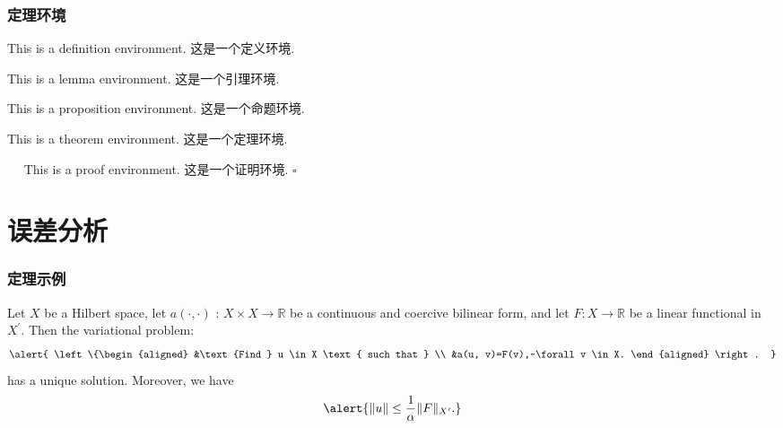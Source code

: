 \documentclass[noamsthm,notheorems,11pt,compress]{beamer}
\numberwithin{figure}{section}
\numberwithin{table}{section}
\numberwithin{equation}{section}
\theoremstyle{plain} %
\newenvironment{proof}[1][证明]{{\color{structure.fg}\textbf{#1}:}~~}{\hfill\ensuremath{\square}\par}
\begin{document}
\begin{frame}
\frametitle{定理环境}
\begin{definition}
This is a definition environment. 这是一个定义环境.
\end{definition}

\begin{lemma}
This is a lemma environment. 这是一个引理环境.
\end{lemma}

\begin{proposition}
This is a proposition environment. 这是一个命题环境.
\end{proposition}

\begin{theorem}
This is a theorem environment. 这是一个定理环境.
\end{theorem}

\begin{proof}
  This is a proof environment. 这是一个证明环境.
\end{proof}

\end{frame}

\section{误差分析}

\begin{frame}
\frametitle{定理示例}

\begin{theorem}
Let $X$ be a Hilbert space, let $a(\cdot, \cdot)$ : $X \times X \rightarrow \mathbb{R}$ be a continuous and coercive bilinear form, and let $F : X \rightarrow \mathbb{R}$ be a linear functional in $X^{\prime}$. Then the variational problem:
\begin{equation}
  \alert{
  \left\{\begin{aligned}
  &\text {Find } u \in X \text { such that } \\
  &a(u, v)=F(v),~\forall v \in X.
  \end{aligned} \right. }
\end{equation}
has a unique solution. Moreover, we have
\begin{equation}
  \alert{ \|u\| \leq \frac{1}{\alpha}\|F\|_{X^{\prime}}.  }
\end{equation}
\end{theorem}

\end{frame}
\end{document}
